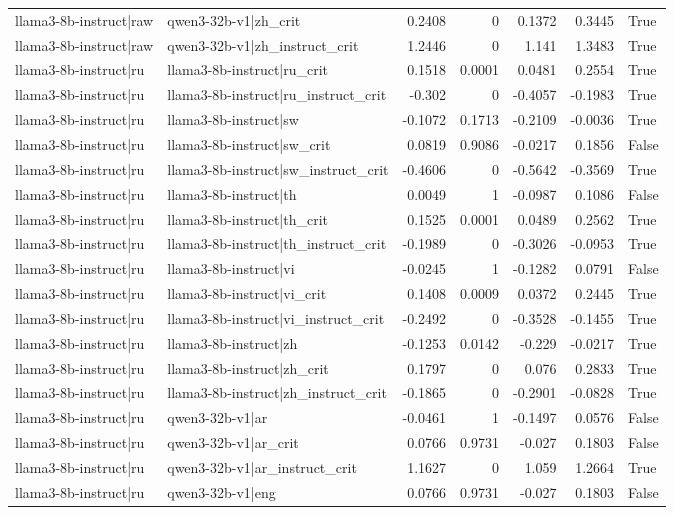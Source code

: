 \begin{table}
\begin{tabular}{l l r r r r l}
llama3-8b-instruct|raw & qwen3-32b-v1|zh_crit & 0.2408 & 0 & 0.1372 & 0.3445 & True \\
llama3-8b-instruct|raw & qwen3-32b-v1|zh_instruct_crit & 1.2446 & 0 & 1.141 & 1.3483 & True \\
llama3-8b-instruct|ru & llama3-8b-instruct|ru_crit & 0.1518 & 0.0001 & 0.0481 & 0.2554 & True \\
llama3-8b-instruct|ru & llama3-8b-instruct|ru_instruct_crit & -0.302 & 0 & -0.4057 & -0.1983 & True \\
llama3-8b-instruct|ru & llama3-8b-instruct|sw & -0.1072 & 0.1713 & -0.2109 & -0.0036 & True \\
llama3-8b-instruct|ru & llama3-8b-instruct|sw_crit & 0.0819 & 0.9086 & -0.0217 & 0.1856 & False \\
llama3-8b-instruct|ru & llama3-8b-instruct|sw_instruct_crit & -0.4606 & 0 & -0.5642 & -0.3569 & True \\
llama3-8b-instruct|ru & llama3-8b-instruct|th & 0.0049 & 1 & -0.0987 & 0.1086 & False \\
llama3-8b-instruct|ru & llama3-8b-instruct|th_crit & 0.1525 & 0.0001 & 0.0489 & 0.2562 & True \\
llama3-8b-instruct|ru & llama3-8b-instruct|th_instruct_crit & -0.1989 & 0 & -0.3026 & -0.0953 & True \\
llama3-8b-instruct|ru & llama3-8b-instruct|vi & -0.0245 & 1 & -0.1282 & 0.0791 & False \\
llama3-8b-instruct|ru & llama3-8b-instruct|vi_crit & 0.1408 & 0.0009 & 0.0372 & 0.2445 & True \\
llama3-8b-instruct|ru & llama3-8b-instruct|vi_instruct_crit & -0.2492 & 0 & -0.3528 & -0.1455 & True \\
llama3-8b-instruct|ru & llama3-8b-instruct|zh & -0.1253 & 0.0142 & -0.229 & -0.0217 & True \\
llama3-8b-instruct|ru & llama3-8b-instruct|zh_crit & 0.1797 & 0 & 0.076 & 0.2833 & True \\
llama3-8b-instruct|ru & llama3-8b-instruct|zh_instruct_crit & -0.1865 & 0 & -0.2901 & -0.0828 & True \\
llama3-8b-instruct|ru & qwen3-32b-v1|ar & -0.0461 & 1 & -0.1497 & 0.0576 & False \\
llama3-8b-instruct|ru & qwen3-32b-v1|ar_crit & 0.0766 & 0.9731 & -0.027 & 0.1803 & False \\
llama3-8b-instruct|ru & qwen3-32b-v1|ar_instruct_crit & 1.1627 & 0 & 1.059 & 1.2664 & True \\
llama3-8b-instruct|ru & qwen3-32b-v1|eng & 0.0766 & 0.9731 & -0.027 & 0.1803 & False \\

\end{tabular}
\end{table}
